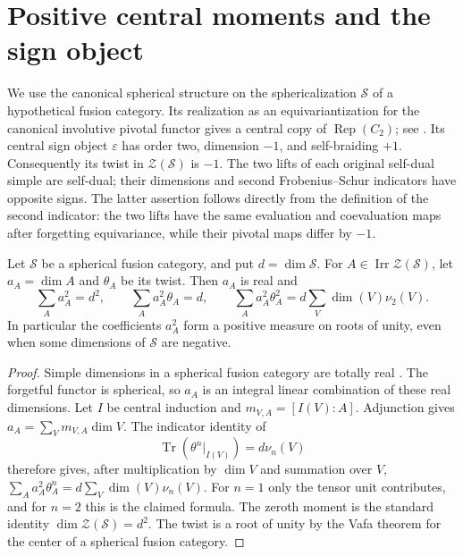 \section{Positive central moments and the sign object}
\label{sec:frontier-signed-gauss}

We use the canonical spherical structure on the sphericalization
$\mathcal S$ of a hypothetical fusion category. Its realization as an
equivariantization for the canonical involutive pivotal functor gives
a central copy of $\operatorname{Rep}(C_2)$; see \cite[Section~5.3]{Bartlett}. Its central sign object
$\varepsilon$ has order two, dimension $-1$, and self-braiding $+1$.
Consequently its twist in $\mathcal Z(\mathcal S)$ is $-1$.
The two lifts of each original self-dual simple are self-dual; their
dimensions and second Frobenius--Schur indicators have opposite signs.
The latter assertion follows directly from the definition of the second
indicator: the two lifts have the same evaluation and coevaluation maps
after forgetting equivariance, while their pivotal maps differ by $-1$.

\begin{lemma}
\label{lem:positive-central-squares}
Let $\mathcal S$ be a spherical fusion category, and put
$d=\dim\mathcal S$. For $A\in\operatorname{Irr}\mathcal Z(\mathcal S)$,
let $a_A=\dim A$ and $\theta_A$ be its twist. Then $a_A$ is real and
\[
 \sum_A a_A^2=d^2,\qquad
 \sum_A a_A^2\theta_A=d,\qquad
 \sum_A a_A^2\theta_A^2=d\sum_V\dim(V)\nu_2(V).
\]
In particular the coefficients $a_A^2$ form a positive measure on roots
of unity, even when some dimensions of $\mathcal S$ are negative.
\end{lemma}
\begin{proof}
Simple dimensions in a spherical fusion category are totally real
\cite[Section~2.1]{OstrikRank3}. The forgetful functor is spherical, so
$a_A$ is an integral linear combination of these real dimensions. Let $I$ be
central induction and $m_{V,A}=[I(V):A]$. Adjunction gives
$a_A=\sum_Vm_{V,A}\dim V$.
The indicator identity of \cite[Theorem~4.1]{NgSchauenburg}
\[
 \operatorname{Tr}(\theta^n\vert_{I(V)})=d\nu_n(V)
\]
therefore gives, after multiplication by $\dim V$ and summation over $V$,
$\sum_A a_A^2\theta_A^n=d\sum_V\dim(V)\nu_n(V)$.
For $n=1$ only the tensor unit contributes, and for $n=2$ this is the
claimed formula. The zeroth moment is the standard identity
$\dim\mathcal Z(\mathcal S)=d^2$. The twist is a root of unity by the
Vafa theorem for the center of a spherical fusion category.
\end{proof}

